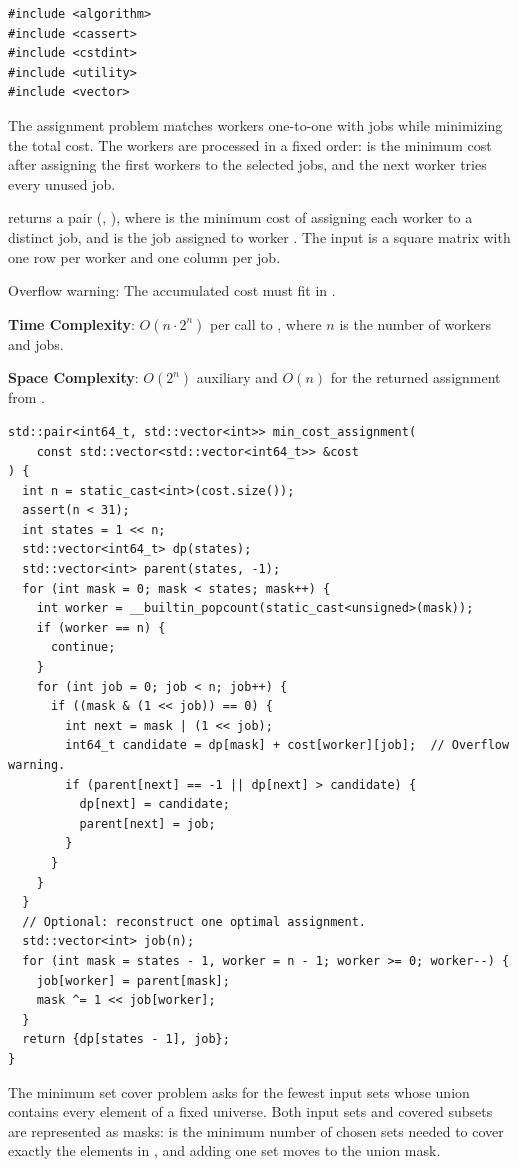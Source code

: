 \begin{lstlisting}[style=cpp]
#include <algorithm>
#include <cassert>
#include <cstdint>
#include <utility>
#include <vector>
\end{lstlisting}
The assignment problem matches workers one-to-one with jobs while minimizing the total cost. The workers are processed in a fixed order:  is the minimum cost after assigning the first  workers to the selected jobs, and the next worker tries every unused job.

\begin{compactitem}
  \item {} returns a pair (, ), where  is the minimum cost of assigning each worker to a distinct job, and  is the job assigned to worker . The input is a square matrix with one row per worker and one column per job.
\end{compactitem}

Overflow warning: The accumulated cost must fit in .

\textbf{Time Complexity}: $O(n \cdot 2^{n})$ per call to , where $n$ is the number of workers and jobs.

\textbf{Space Complexity}: $O(2^{n})$ auxiliary and $O(n)$ for the returned assignment from .

\begin{lstlisting}[style=cpp]
std::pair<int64_t, std::vector<int>> min_cost_assignment(
    const std::vector<std::vector<int64_t>> &cost
) {
  int n = static_cast<int>(cost.size());
  assert(n < 31);
  int states = 1 << n;
  std::vector<int64_t> dp(states);
  std::vector<int> parent(states, -1);
  for (int mask = 0; mask < states; mask++) {
    int worker = __builtin_popcount(static_cast<unsigned>(mask));
    if (worker == n) {
      continue;
    }
    for (int job = 0; job < n; job++) {
      if ((mask & (1 << job)) == 0) {
        int next = mask | (1 << job);
        int64_t candidate = dp[mask] + cost[worker][job];  // Overflow warning.
        if (parent[next] == -1 || dp[next] > candidate) {
          dp[next] = candidate;
          parent[next] = job;
        }
      }
    }
  }
  // Optional: reconstruct one optimal assignment.
  std::vector<int> job(n);
  for (int mask = states - 1, worker = n - 1; worker >= 0; worker--) {
    job[worker] = parent[mask];
    mask ^= 1 << job[worker];
  }
  return {dp[states - 1], job};
}
\end{lstlisting}
The minimum set cover problem asks for the fewest input sets whose union contains every element of a fixed universe. Both input sets and covered subsets are represented as masks:  is the minimum number of chosen sets needed to cover exactly the elements in , and adding one set moves to the union mask.

